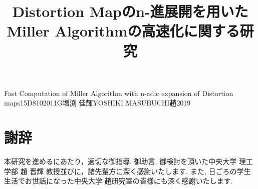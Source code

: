 \documentclass[a4j,oneside,openany]{jsbook}
\begin{document}

\title{Distortion Mapのn-進展開を用いた　Miller Algorithmの高速化に関する研究}{Fast Computation of Miller Algorithm with n-adic expansion of Distortion maps}{15D8102011G}{増渕 佳輝}{YOSHIKI MASUBUCHI}{趙}{2019}

\setcounter{page}{1}


\newpage

\tableofcontents
\newpage











\chapter*{謝辞}
本研究を進めるにあたり，適切な御指導, 御助言, 御検討を頂いた中央大学 理工学部 趙 晋輝 教授並びに，諸先輩方に深く感謝いたします. また, 日ごろの学生生活でお世話になった中央大学 趙研究室の皆様にも深く感謝いたします.
\end{document}
